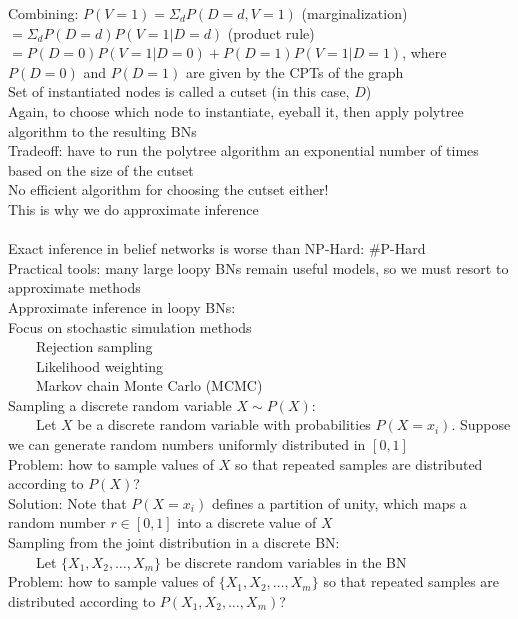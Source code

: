 \documentclass[10pt,letterpaper,unboxed,cm]{article}
\newcommand{\tab}{~~~~}
\begin{document}
Combining: $P(V = 1) = \Sigma_d P(D = d, V = 1)$ (marginalization)\\
$ = \Sigma_d P(D = d)P(V = 1|D = d)$ (product rule)\\
$ = P(D = 0)P(V = 1|D = 0) + P(D = 1)P(V = 1|D = 1)$, where $P(D = 0)$ and $P(D = 1)$ are given by the CPTs of the graph\\
Set of instantiated nodes is called a cutset (in this case, $D$)\\
Again, to choose which node to instantiate, eyeball it, then apply polytree algorithm to the resulting BNs\\
Tradeoff: have to run the polytree algorithm an exponential number of times based on the size of the cutset\\
No efficient algorithm for choosing the cutset either!\\
This is why we do approximate inference\\\\
Exact inference in belief networks is worse than NP-Hard: \#P-Hard\\
Practical tools: many large loopy BNs remain useful models, so we must resort to approximate methods\\
Approximate inference in loopy BNs: \\
Focus on stochastic simulation methods\\
\tab Rejection sampling\\
\tab Likelihood weighting\\
\tab Markov chain Monte Carlo (MCMC)\\
Sampling a discrete random variable $X \sim P(X)$: \\
\tab Let $X$ be a discrete random variable with probabilities $P(X = x_i)$. Suppose we can generate random numbers uniformly distributed in $[0, 1]$\\
Problem: how to sample values of $X$ so that repeated samples are distributed according to $P(X)$?\\
Solution: Note that $P(X = x_i)$ defines a partition of unity, which maps a random number $r \in [0,1]$ into a discrete value of $X$\\
Sampling from the joint distribution in a discrete BN: \\
\tab Let $\{X_1, X_2, \ldots, X_m\}$ be discrete random variables in the BN\\
Problem: how to sample values of $\{X_1, X_2, \ldots, X_m\}$ so that repeated samples are distributed according to $P(X_1, X_2, \ldots, X_m)$?\\
\end{document}
